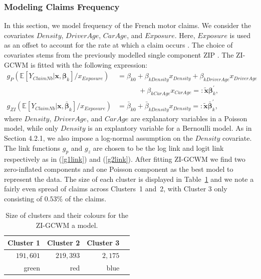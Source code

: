 \documentclass[12pt,letterpaper]{article}
\numberwithin{equation}{section}
\numberwithin{equation}{section}
\numberwithin{equation}{section}
\newcommand{\xTilda}{\tilde{\bm{x}}}
\begin{document}
 \subsubsection{Modeling Claims Frequency}

In this section, we model frequency of the French motor claims. We consider the covariates $Density$, $DriverAge$, $CarAge$, and $Exposure$. Here, $Exposure$ is used as an offset to account for the rate at which a claim occurs \citep[see][]{frees2015}. The choice of covariates stems from the previously modelled single component ZIP \citep{Charpentier:2014}.
The ZI-GCWM is fitted with the following expression:
\begin{align}
g_P(\mathbb{E}\left[Y_{ClaimNb}|\bm{x}, \bm{\beta}_k \right]/x_{Exposure}) & = 
  \beta_{k0} +  \beta_{kDensity}x_{Density}+ \beta_{kDriverAge}x_{DriverAge} \nonumber \\    &  \quad\quad\quad +  \beta_{kCarAge}x_{CarAge}  =: \bm{\xTilda} \bm{\beta}_k^{'},   \label{poissonReg}\\
g_{ZI}(\mathbb{E}\left[Y_{ClaimNb}|\bm{x}, \bar{\bm{\beta}}_k \right]/x_{Exposure})& = \bar{\beta}_{k0} +  \bar{\beta}_{kDensity} x_{Density} =: \bm{\xTilda} \bar{\bm{\beta}}_k^{'},  \label{zeroReg} 
\end{align}
where $Density$, $DriverAge$, and $CarAge$ are explanatory variables in a Poisson model, while only $Density$ is an explantory variable for a Bernoulli model. As in Section 4.2.1, we also impose a log-normal assumption on the $Density$ covariate. The link functions $g_p$ and $g_z$ are chosen to be the log link and logit link respectively as in (\ref{g1link}) and (\ref{g2link}).
After fitting ZI-GCWM we find two zero-inflated components and one Poisson component as the best model to represent the data. The size of each cluster is displayed in Table~\ref{table:sizeFreq} and we note a fairly even spread of claims across Clusters~1 and~2, with Cluster 3 only consisting of $0.53 \%$ of the claims.
\begin{table}[!htb]
\centering
\caption{Size of clusters and their colours for the ZI-GCWM a model.}
\label{table:sizeFreq}
\begin{tabular}{rrrr}
\hline
Cluster 1   & Cluster 2  & Cluster 3   \\
\hline
$191,601$& $219,393$ & $2,175$ \\
green & red & blue  \\
\hline
\end{tabular}
\end{table}
\end{document}

